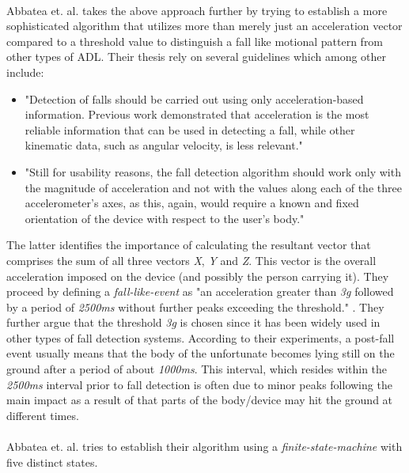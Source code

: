 \documentclass[12pt, a4paper, onecolumn]{article}
\begin{document}
		\paragraph{} Abbatea et. al. takes the above approach further by trying to establish a more sophisticated algorithm that utilizes more than merely just an acceleration vector compared to a threshold value to distinguish a fall like motional pattern from other types of ADL. Their thesis rely on several guidelines which among other include: 
			\begin{itemize} 
				\item "Detection of falls should be carried out using only acceleration-based information. Previous work demonstrated that acceleration is the most reliable information that can be used in detecting a fall, while other kinematic data, such as angular velocity, is less relevant." \cite[p~3]{piza_uni}
				
				\item "Still for usability reasons, the fall detection algorithm should work only with the magnitude of acceleration and not with the values along each of the three accelerometer’s axes, as this, again, would require a known and fixed orientation of the device with respect to the user’s body." \cite[p~3]{piza_uni}
			\end{itemize}
		
		The latter identifies the importance of calculating the resultant vector that comprises the sum of all three vectors \textit{X}, \textit{Y} and \textit{Z}. This vector is the overall acceleration imposed on the device (and possibly the person carrying it). They proceed by defining a \textit{fall-like-event} as "an acceleration greater than \textit{3g} followed by a period of \textit{2500ms} without further peaks exceeding the threshold." \cite[p~5]{piza_uni}. They further argue that the threshold \textit{3g} is chosen since it has been widely used in other types of fall detection systems. According to their experiments, a post-fall event usually means that the body of the unfortunate becomes lying still on the ground after a period of about \textit{1000ms}. This interval, which resides within the \textit{2500ms} interval prior to fall detection is often due to minor peaks following the main impact as a result of that parts of the body/device may hit the ground at different times. 
		
		\paragraph{} Abbatea et. al. tries to establish their algorithm using a \textit{finite-state-machine} with five distinct states.
		
\end{document}
